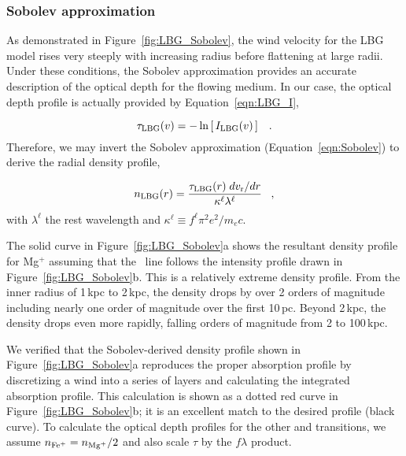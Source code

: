 \documentclass[12pt,preprint]{aastex}
\begin{document}
\subsubsection{Sobolev approximation}
\label{sec:Sobolev}

As demonstrated in Figure~\ref{fig:LBG_Sobolev}, the wind velocity for
the LBG model rises very steeply with increasing radius before
flattening at large radii.  Under these conditions, the Sobolev
approximation provides an accurate description of the optical depth
for the flowing medium. 
In our case, the optical depth profile is actually provided by 
Equation~\ref{eqn:LBG_I}, 

\begin{equation}
\tau_{\rm LBG}(v) = -\ln \left [ \, I_{\rm LBG}(v) \, \right ] \;\;\; .
\label{eqn:tauLBG}
\end{equation}
Therefore, we may invert the Sobolev approximation (Equation~\ref{eqn:Sobolev})
to derive the radial density profile,

\begin{equation}
n_{\rm LBG}(r) = \frac{\tau_{\rm LBG}(r) \; dv_{\rm r}/dr}{\kappa^\ell
  \lambda^\ell} \;\;\; ,
\label{eqn:nSobolev}
\end{equation}
with $\lambda^\ell$ the rest wavelength and $\kappa^\ell \equiv f^\ell
\pi^2 e^2/m_e c$.  

The solid curve in Figure~\ref{fig:LBG_Sobolev}a shows the
resultant density profile for Mg$^+$ assuming that the \mgiia\ line
follows the intensity profile drawn in Figure~\ref{fig:LBG_Sobolev}b. 
This is a relatively extreme density profile.  From the inner radius
of 1\,kpc to 2\,kpc, the density drops by over 2 orders of
magnitude including nearly one order of magnitude over the first
10\,pc.  Beyond 2\,kpc, the density drops even more rapidly, falling
orders of magnitude from 2 to 100\,kpc.

We verified that the Sobolev-derived density profile shown in
Figure~\ref{fig:LBG_Sobolev}a
reproduces the proper
absorption profile by discretizing a wind into a series of layers
and calculating the integrated absorption profile.  This
calculation is shown as a dotted red curve in
Figure~\ref{fig:LBG_Sobolev}b; it is an excellent
match to the desired profile (black curve).
To calculate the optical depth profiles for the other  and
 transitions, we
assume $n_{\rm Fe^+} = n_{\rm Mg^+}/2$ and also scale $\tau$ by the $f\lambda$ product.
\end{document}
